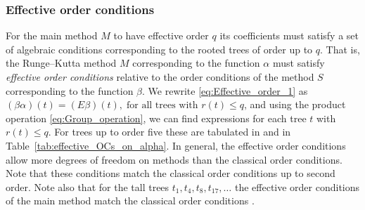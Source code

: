 
\subsubsection{Effective order conditions}\label{sec:effOrderCond}
For the main method $M$ to have effective order $q$ its coefficients must satisfy a set of algebraic conditions corresponding to the rooted trees of order up to $q$.
That is, the Runge--Kutta method $M$ corresponding to the function $\alpha$ must satisfy
\emph{effective order conditions} relative to the order conditions of the
method $S$ corresponding to the function $\beta$.
We rewrite \eqref{eq:Effective_order_1} as
$(\beta\alpha)(t) = (E\beta)(t), \; \text{for all trees with $r(t) \leq q$,}$
and using the product operation \eqref{eq:Group_operation}, we can find expressions for each tree $t$ with $r(t) \leq q$.
For trees up to order five these are tabulated in \cite[Sec~389]{Butcher2008_book}
and in Table~\ref{tab:effective_OCs_on_alpha}.
In general, the effective order conditions allow more degrees of
freedom on methods than the classical order conditions.
Note that these conditions match the classical order conditions up to
second order.
Note also that for the tall trees $t_1, t_4, t_8, t_{17}, \dots$ the
effective order conditions of the main method match the classical
order conditions \cite{Butcher2008_book}.
